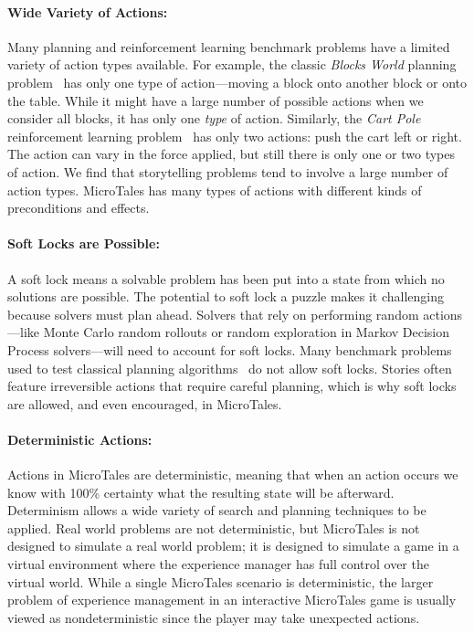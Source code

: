 \documentclass{nilreport}
\begin{document}
\paragraph{Wide Variety of Actions:} Many planning and reinforcement learning benchmark problems have a limited variety of action types available. For example, the classic {\em Blocks World} planning problem~\cite{slaney2001blocks} has only one type of action---moving a block onto another block or onto the table. While it might have a large number of possible actions when we consider all blocks, it has only one {\em type} of action. Similarly, the {\em Cart Pole} reinforcement learning problem~\cite{towers2024gymnasium} has only two actions: push the cart left or right. The action can vary in the force applied, but still there is only one or two types of action. We find that storytelling problems tend to involve a large number of action types. MicroTales has many types of actions with different kinds of preconditions and effects.

\paragraph{Soft Locks are Possible:} A soft lock means a solvable problem has been put into a state from which no solutions are possible. The potential to soft lock a puzzle makes it challenging because solvers must plan ahead. Solvers that rely on performing random actions---like Monte Carlo random rollouts or random exploration in Markov Decision Process solvers---will need to account for soft locks. Many benchmark problems used to test classical planning algorithms~\cite{taitler2023ipc} do not allow soft locks. Stories often feature irreversible actions that require careful planning, which is why soft locks are allowed, and even encouraged, in MicroTales.

\paragraph{Deterministic Actions:} Actions in MicroTales are deterministic, meaning that when an action occurs we know with 100\% certainty what the resulting state will be afterward. Determinism allows a wide variety of search and planning techniques to be applied. Real world problems are not deterministic, but MicroTales is not designed to simulate a real world problem; it is designed to simulate a game in a virtual environment where the experience manager has full control over the virtual world. While a single MicroTales scenario is deterministic, the larger problem of experience management in an interactive MicroTales game is usually viewed as nondeterministic since the player may take unexpected actions.
\end{document}
